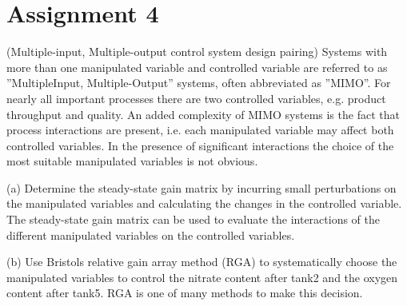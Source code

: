 \section*{Assignment 4}\label{sec:Assignment4}
(Multiple-input, Multiple-output control system design pairing)
Systems with more than one manipulated variable and controlled variable are referred to as ”MultipleInput,
Multiple-Output” systems, often abbreviated as ”MIMO”. For nearly all important processes
there are two controlled variables, e.g. product throughput and quality. An added complexity of
MIMO systems is the fact that process interactions are present, i.e. each manipulated variable may
affect both controlled variables. In the presence of significant interactions the choice of the most
suitable manipulated variables is not obvious.

(a) Determine the steady-state gain matrix by incurring small perturbations on the manipulated variables
and calculating the changes in the controlled variable. The steady-state gain matrix can be
used to evaluate the interactions of the different manipulated variables on the controlled variables.

(b) Use Bristols relative gain array method (RGA) to systematically choose the manipulated variables
to control the nitrate content after tank2 and the oxygen content after tank5. RGA is one of many
methods to make this decision.
